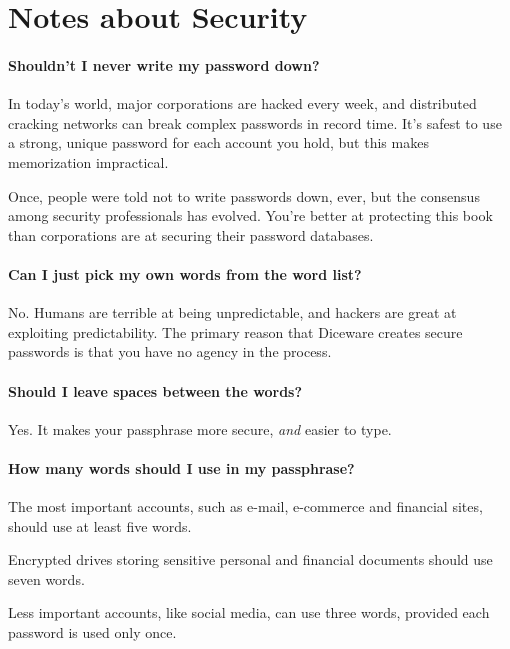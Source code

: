 \chapter*{Notes about Security}
\label{ch:qna}

\subsubsection{Shouldn't I never write my password down?}

In today's world, major corporations are hacked every week, and distributed cracking networks can break complex passwords in record time. It's safest to use a strong, unique password for each account you hold, but this makes memorization impractical. 

Once, people were told not to write passwords down, ever, but the consensus among security professionals has evolved. You're better at protecting this book than corporations are at securing their password databases. 

\subsubsection{Can I just pick my own words from the word list?}

No. Humans are terrible at being unpredictable, and hackers are great at exploiting predictability. The primary reason that Diceware creates secure passwords is that you have no agency in the process.

\subsubsection{Should I leave spaces between the words?}

Yes. It makes your passphrase more secure, \textit{and} easier to type.

\subsubsection{How many words should I use in my passphrase?}

The most important accounts, such as e-mail, e-commerce and financial sites, should use at least five words.

Encrypted drives storing sensitive personal and financial documents should use seven words.

Less important accounts, like social media, can use three words, provided each password is used only once.

